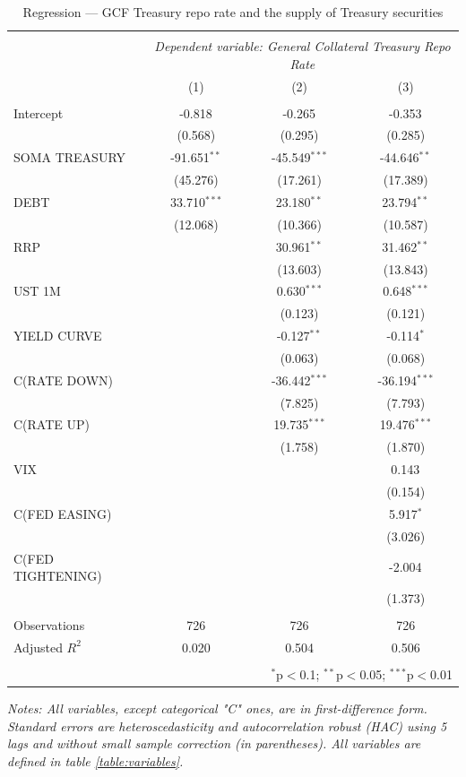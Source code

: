 \documentclass[11pt,a4paper,english,oneside]{article}
\begin{document}
\begin{table}[!htbp] \centering
\caption{Regression --- GCF Treasury repo rate and the supply of Treasury securities}
\label{table:reg1}
\begin{tabular}{@{\extracolsep{5pt}}lccc}
\\[-1.8ex]\hline
\hline \\[-1.8ex]
& \multicolumn{3}{c}{\textit{Dependent variable: General Collateral Treasury Repo Rate}} \
\cr \cline{3-4}
  \\[-1.8ex] & (1) & (2) & (3) \\
\hline \\[-1.8ex]
 Intercept & -0.818$^{}$ & -0.265$^{}$ & -0.353$^{}$ \\
  & (0.568) & (0.295) & (0.285) \\
 SOMA TREASURY & -91.651$^{**}$ & -45.549$^{***}$ & -44.646$^{**}$ \\
  & (45.276) & (17.261) & (17.389) \\
 DEBT & 33.710$^{***}$ & 23.180$^{**}$ & 23.794$^{**}$ \\
  & (12.068) & (10.366) & (10.587) \\
 RRP & & 30.961$^{**}$ & 31.462$^{**}$ \\
  & & (13.603) & (13.843) \\
 UST 1M & & 0.630$^{***}$ & 0.648$^{***}$ \\
  & & (0.123) & (0.121) \\
 YIELD CURVE & & -0.127$^{**}$ & -0.114$^{*}$ \\
  & & (0.063) & (0.068) \\
 C(RATE DOWN) & & -36.442$^{***}$ & -36.194$^{***}$ \\
  & & (7.825) & (7.793) \\
 C(RATE UP) & & 19.735$^{***}$ & 19.476$^{***}$ \\
  & & (1.758) & (1.870) \\
 VIX & & & 0.143$^{}$ \\
  & & & (0.154) \\
 C(FED EASING) & & & 5.917$^{*}$ \\
  & & & (3.026) \\
 C(FED TIGHTENING) & & & -2.004$^{}$ \\
  & & & (1.373) \\
\hline \\[-1.8ex]
 Observations & 726 & 726 & 726 \\
 Adjusted $R^2$ & 0.020 & 0.504 & 0.506 \\
\hline
\hline \\[-1.8ex]
  & \multicolumn{3}{r}{$^{*}$p$<$0.1; $^{**}$p$<$0.05; $^{***}$p$<$0.01} \\[8pt]
\end{tabular}
\begin{flushleft}
  \textit{Notes: All variables, except categorical "C" ones, are in first-difference form. Standard errors are heteroscedasticity and autocorrelation robust (HAC) using 5 lags and without small sample correction (in parentheses). All variables are defined in table \ref{table:variables}.}
\end{flushleft}
\end{table}
\end{document}
